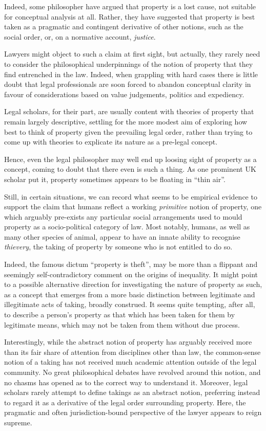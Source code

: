 Indeed, some philosopher have argued that property is a lost cause, not suitable for conceptual analysis at all. Rather, they have suggested that property is best taken as a pragmatic and contingent derivative of other notions, such as the social order, or, on a normative account, {\it justice}. 

Lawyers might object to such a claim at first sight, but actually, they rarely need to consider the philosophical underpinnings of the notion of property that they find entrenched in the law. Indeed, when grappling with hard cases there is little doubt that legal professionals are soon forced to abandon conceptual clarity in favour of considerations based on value judgements, politics and expediency.

Legal scholars, for their part, are usually content with theories of property that remain largely descriptive, settling for the more modest aim of exploring how best to think of property given the prevailing legal order, rather than trying to come up with theories to explicate its nature as a pre-legal concept.

Hence, even the legal philosopher may well end up loosing sight of property as a concept, coming to doubt that there even is such a thing. As one prominent UK scholar put it, property sometimes appears to be floating in ``thin air''.

Still, in certain situations, we can record what seems to be empirical evidence to support the claim that humans reflect a working {\it primitive} notion of property, one which arguably pre-exists any particular social arrangements used to mould property as a socio-political category of law. Most notably, humans, as well as many other species of animal, appear to have an innate ability to recognise {\it thievery}, the taking of property by someone who is not entitled to do so.

Indeed, the famous dictum ``property is theft'', may be more than a flippant and seemingly self-contradictory comment on the origins of inequality. It might point to a possible alternative direction for investigating the nature of property as such, as a concept that emerges from a more basic distinction between legitimate and illegitimate acts of taking, broadly construed. It seems quite tempting, after all, to describe a person's property as that which has been taken for them by legitimate means, which may not be taken from them without due process.

Interestingly, while the abstract notion of property has arguably received more than its fair share of attention from disciplines other than law, the common-sense notion of a taking has not received much academic attention outside of the legal community. No great philosophical debates have revolved around this notion, and no chasms has opened as to the correct way to understand it. Moreover, legal scholars rarely attempt to define takings as an abstract notion, preferring instead to regard it as a derivative of the legal order surrounding property. Here, the pragmatic and often jurisdiction-bound perspective of the lawyer appears to reign supreme.

